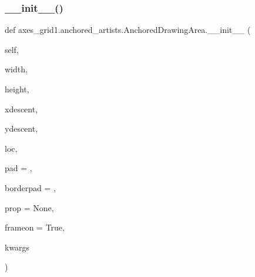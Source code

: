 \subsubsection{\texorpdfstring{\+\_\+\+\_\+init\+\_\+\+\_\+()}{\_\_init\_\_()}}
{\footnotesize\ttfamily def axes\+\_\+grid1.\+anchored\+\_\+artists.\+Anchored\+Drawing\+Area.\+\_\+\+\_\+init\+\_\+\+\_\+ (\begin{DoxyParamCaption}\item[{}]{self,  }\item[{}]{width,  }\item[{}]{height,  }\item[{}]{xdescent,  }\item[{}]{ydescent,  }\item[{}]{loc,  }\item[{}]{pad = {},  }\item[{}]{borderpad = {},  }\item[{}]{prop = {\ttfamily None},  }\item[{}]{frameon = {\ttfamily True},  }\item[{}]{kwargs }\end{DoxyParamCaption})}

